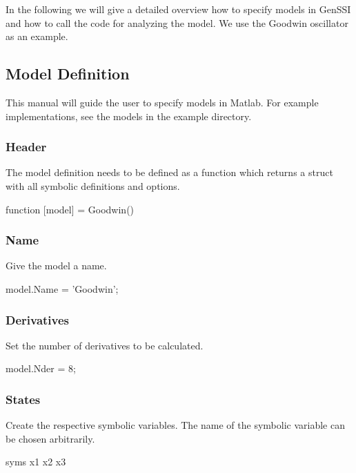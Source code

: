 In the following we will give a detailed overview how to specify models in Gen\+S\+SI and how to call the code for analyzing the model. We use the Goodwin oscillator as an example.\hypertarget{def_simu_definition}{}\subsection{Model Definition}\label{def_simu_definition}
This manual will guide the user to specify models in Matlab. For example implementations, see the models in the example directory.\hypertarget{def_simu_header}{}\subsubsection{Header}\label{def_simu_header}
The model definition needs to be defined as a function which returns a struct with all symbolic definitions and options.


\begin{DoxyCode}
\textcolor{keyword}{function} [model] = Goodwin() 
\end{DoxyCode}
\hypertarget{def_simu_name}{}\subsubsection{Name}\label{def_simu_name}
Give the model a name.


\begin{DoxyCode}
model.Name = \textcolor{stringliteral}{'Goodwin'}; 
\end{DoxyCode}
\hypertarget{def_simu_derivatives}{}\subsubsection{Derivatives}\label{def_simu_derivatives}
Set the number of derivatives to be calculated.


\begin{DoxyCode}
model.Nder = 8; 
\end{DoxyCode}
\hypertarget{def_simu_states}{}\subsubsection{States}\label{def_simu_states}
Create the respective symbolic variables. The name of the symbolic variable can be chosen arbitrarily.


\begin{DoxyCode}
syms x1 x2 x3 
\end{DoxyCode}


